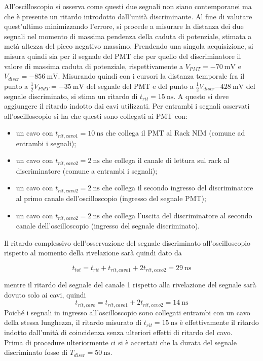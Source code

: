 \documentclass[10pt,a4paper]{article}
\begin{document}
All'oscilloscopio si osserva come questi due segnali non siano contemporanei ma che è presente un ritardo introdotto dall'unità discriminante. Al fine di valutare quest'ultimo minimizzando l'errore, si procede a misurare la distanza dei due segnali nel momento di massima pendenza della caduta di potenziale, stimata a metà altezza del picco negativo massimo. Prendendo una singola acquisizione, si misura quindi sia per il segnale del PMT che per quello del discriminatore il valore di massima caduta di potenziale, rispettivamente a $V_{PMT}=\SI{-70}{\milli \volt}$ e $V_{discr}=\SI{-856}{\milli \volt}$. Misurando quindi con i cursori la distanza temporale fra il punto a $\frac{1}{2}V_{PMT}=\SI{-35}{\milli \volt}$ del segnale del PMT e del punto a $\frac{1}{2}V_{discr}\SI{-428}{\milli \volt}$ del segnale discriminato, si stima un ritardo di $t_{rit}=\SI{15}{\nano \second}$. A questo si deve aggiungere il ritardo indotto dai cavi utilizzati. Per entrambi i segnali osservati all'oscilloscopio si ha che questi sono collegati ai PMT con:

\begin{itemize}
    \item un cavo con $t_{rit, cavo1}=\SI{10}{\nano \second}$ che collega il PMT al Rack NIM (comune ad entrambi i segnali);
    \item un cavo con $t_{rit, cavo2}=\SI{2}{\nano \second}$ che collega il canale di lettura sul rack al discriminatore (comune a entrambi i segnali);
    \item un cavo con $t_{rit, cavo2}=\SI{2}{\nano \second}$ che collega il secondo ingresso del discriminatore al primo canale dell'oscilloscopio (ingresso del segnale PMT);
    \item un cavo con $t_{rit, cavo2}=\SI{2}{\nano \second}$ che collega l'uscita del discriminatore al secondo canale dell'oscilloscopio (ingresso del segnale discriminato).
\end{itemize} 
Il ritardo complessivo dell'osservazione del segnale discriminato all'oscilloscopio rispetto al momento della rivelazione sarà quindi dato da

\[t_{tot}=t_{rit}+t_{rit, cavo1}+2t_{rit, cavo2}=\SI{29}{\nano \second}\]

mentre il ritardo del segnale del canale 1 rispetto alla rivelazione del segnale sarà dovuto solo ai cavi, quindi \[t_{rit, cavo}=t_{rit, cavo1}+2t_{rit, cavo2}=\SI{14}{\nano \second}\]
Poiché i segnali in ingresso all'oscilloscopio sono collegati entrambi con un cavo della stessa lunghezza, il ritardo misurato di $t_{rit}=\SI{15}{\nano \second}$ è effettivamente il ritardo indotto dall'unità di coincidenza senza ulteriori effetti di ritardo del cavo. \\
Prima di procedure ulteriormente ci si è accertati che la durata del segnale discriminato fosse di $T_{discr}=\SI{50}{\nano \second}$.
\end{document}
